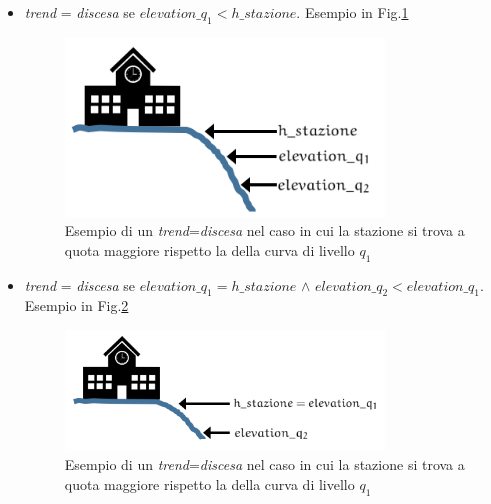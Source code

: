 \begin{enumerate}
\begin{itemize}
\item \textit{trend} = \textit{discesa} se $elevation\_q_1 < h\_stazione$.\newline
Esempio in Fig.\ref{fig:discesa1}

\begin{figure}[bth]
  \centering
    \includegraphics[width=0.8\textwidth]{img/discesa1}
      \caption{Esempio di un \textit{trend}=\textit{discesa}
      \label{fig:discesa1}
nel caso in cui la stazione si trova a quota maggiore rispetto la della curva di livello $q_1$}
\end{figure}



\item \textit{trend} = \textit{discesa} se $elevation\_q_1 = h\_stazione$ $\wedge$ $elevation\_q_2 < elevation\_q_1$.\newline
Esempio in Fig.\ref{fig:discesa2}
\begin{figure}[bth]
  \centering
    \includegraphics[width=0.8\textwidth]{img/discesa2}
      \caption{Esempio di un \textit{trend}=\textit{discesa}
        \label{fig:discesa2}
nel caso in cui la stazione si trova a quota maggiore rispetto la della curva di livello $q_1$}
\end{figure}

\end{itemize}


\end{enumerate}
